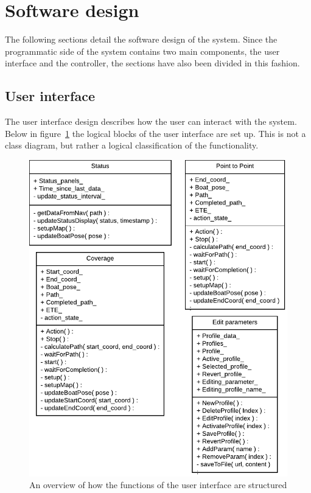 \newpage
\section{Software design}
\label{sec:software_design}
The following sections detail the software design of the system. Since the programmatic side of the system contains two main components, the user interface and the controller, the sections have also been divided in this fashion.

\subsection{User interface}

The user interface design describes how the user can interact with the system. Below in figure~\ref{fig:userinterfaceoverview} the logical blocks of the user interface are set up. This is not a class diagram, but rather a logical classification of the functionality.

\begin{figure}[H]
	\centering
	\includegraphics[width=0.9\linewidth]{Images/Design/User_Interface_overview}
	\caption{An overview of how the functions of the user interface are structured}
	\label{fig:userinterfaceoverview}
\end{figure}


